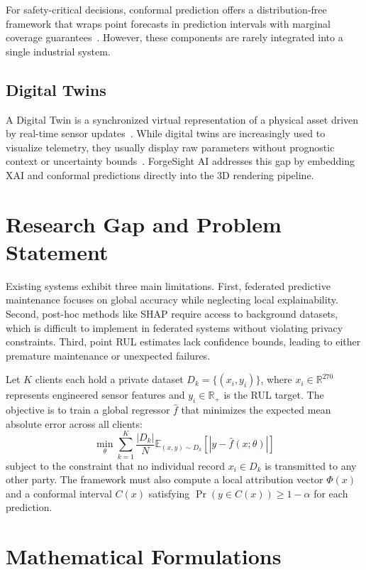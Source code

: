 \documentclass[letterpaper, 10 pt, conference]{ieeeconf}
\begin{document}
For safety-critical decisions, conformal prediction offers a distribution-free framework that wraps point forecasts in prediction intervals with marginal coverage guarantees~\cite{vovk2008,angelopoulos2021,lei2018}. However, these components are rarely integrated into a single industrial system.

\subsection{Digital Twins}
\label{subsec:dt_lit}
A Digital Twin is a synchronized virtual representation of a physical asset driven by real-time sensor updates~\cite{grieves2017,fuller2020}. While digital twins are increasingly used to visualize telemetry, they usually display raw parameters without prognostic context or uncertainty bounds~\cite{rasheed2020,jones2020,zhong2023}. ForgeSight AI addresses this gap by embedding XAI and conformal predictions directly into the 3D rendering pipeline.

\section{Research Gap and Problem Statement}
\label{sec:gap}
Existing systems exhibit three main limitations. First, federated predictive maintenance focuses on global accuracy while neglecting local explainability. Second, post-hoc methods like SHAP require access to background datasets, which is difficult to implement in federated systems without violating privacy constraints. Third, point RUL estimates lack confidence bounds, leading to either premature maintenance or unexpected failures.

Let $K$ clients each hold a private dataset $D_k = \{(x_i, y_i)\}$, where $x_i \in \mathbb{R}^{270}$ represents engineered sensor features and $y_i \in \mathbb{R}_{+}$ is the RUL target. The objective is to train a global regressor $\hat{f}$ that minimizes the expected mean absolute error across all clients:
\begin{equation}
  \min_{\theta} \sum_{k=1}^K \frac{|D_k|}{N} \mathbb{E}_{(x,y)\sim D_k} \left[ |y - \hat{f}(x; \theta)| \right]
\end{equation}
subject to the constraint that no individual record $x_i \in D_k$ is transmitted to any other party. The framework must also compute a local attribution vector $\Phi(x)$ and a conformal interval $C(x)$ satisfying $\Pr(y \in C(x)) \geq 1 - \alpha$ for each prediction.

\section{Mathematical Formulations}
\label{sec:methodology}
\end{document}
